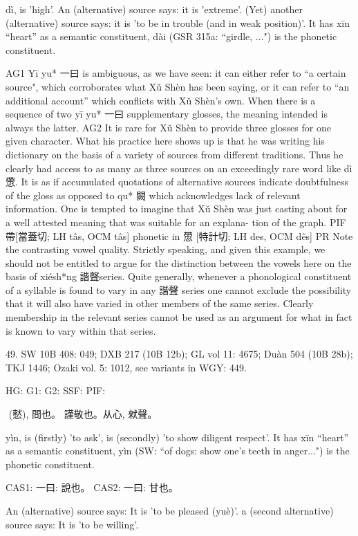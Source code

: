 dì,
is 'high'.
An (alternative) source says:
it is 'extreme'.
(Yet) another (alternative) source says:
it is 'to be in trouble (and in weak position)'. It has xīn ``heart'' as a semantic constituent,
dài (GSR 315a: ``girdle, ...") is the phonetic constituent.

AG1 Yī yu* 一曰 is ambiguous, as we have seen: it can either refer to ``a certain source", which corroborates what Xǔ Shèn has been saying, or it can refer to ``an additional account'' which conflicts with Xǔ Shèn's own. When there is a sequence of two yī yu* 一曰 supplementary glosses, the meaning intended is always the latter.
AG2 It is rare for Xǔ Shèn to provide three glosses for one given character. What his practice here shows up is that he was writing his dictionary on the basis of a variety of sources from different traditions. Thus he clearly had access to as many as three sources on an exceedingly rare word like dì 慸. It is as if accumulated quotations of alternative sources indicate doubtfulness of the gloss as opposed to qu* 闕 which acknowledges lack of relevant information. One is tempted to imagine that Xǔ Shèn was just casting about for a well attested meaning that was suitable for an explana- tion of the graph.
PIF    帶[當蓋切; LH tâs, OCM tâs] phonetic in 慸 [特計切; LH des, OCM dês]
PR    Note the contrasting vowel quality. Strictly speaking, and given this example, we should not be entitled to argue for the distinction between the vowels here on the basis of xiésh*ng 諧聲series. Quite generally, whenever a phonological constituent of a syllable is found to vary in any 諧聲 series one cannot exclude the possibility that it will also have varied in other members of the same series. Clearly membership in the relevant series cannot be used as an argument for what in fact is known to vary within that series.



49. SW 10B 408: 049; DXB 217 (10B 12b); GL vol 11: 4675; Duàn 504 (10B 28b); TKJ 1446; Ozaki vol. 5: 1012, see
variants in WGY: 449.


HG:
G1:
G2: SSF: PIF:

 (憖), 問也。 謹敬也。从心,
猌聲。


yìn,
is (firstly) 'to ask',
is (secondly) 'to show diligent respect'.
It has xīn ``heart'' as a semantic constituent,
yìn (SW: ``of dogs: show one's teeth in anger...") is the phonetic constituent.

CAS1: 一曰:
說也。
CAS2: 一曰:
甘也。

An (alternative) source says: It is 'to be pleased (yuè)'.
a (second alternative) source says: It is 'to be willing'.

